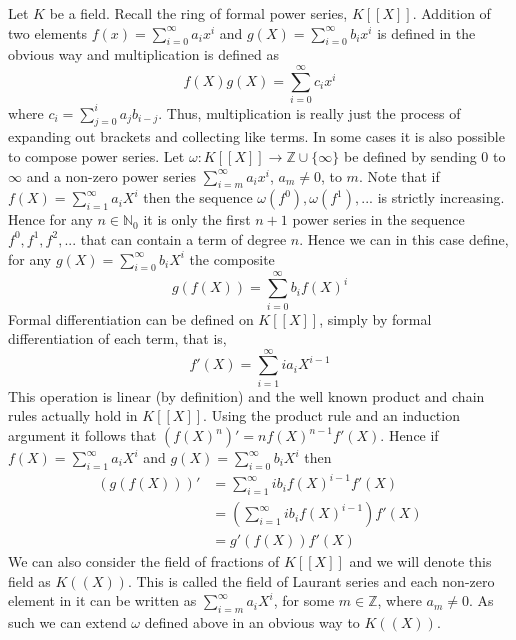 \documentclass{article}
\newcommand{\mbb}[1]{\mathbb{#1}}
\numberwithin{equation}{section}
\begin{document}
Let $K$ be a field. Recall the ring of formal power series, $K[[X]]$. Addition of two elements $f(x) = \sum_{i = 0}^\infty a_ix^i$ and $g(X) = \sum_{i = 0}^\infty b_ix^i$ is defined in the obvious way and multiplication is defined as
$$f(X)g(X) = \sum_{i = 0}^{\infty}c_i x^i$$
where $c_i = \sum_{j = 0}^i a_j b_{i-j}$. Thus, multiplication is really just the process of expanding out brackets and collecting like terms. In some cases it is also possible to compose power series. Let $\omega : K[[X]] \to \mbb Z \cup \{\infty \}$ be defined by sending $0$ to $\infty$ and a non-zero power series $\sum_{i = m}^\infty a_i x^i$, $a_m \neq 0$, to $m$. Note that if $f(X) = \sum_{i = 1}^\infty a_iX^i$ then the sequence $\omega(f^0), \omega(f^1), ...$ is strictly increasing. Hence for any $n \in \mbb N_0$ it is only the first $n+1$ power series in the sequence $f^0, f^1, f^2, ...$ that can contain a term of degree $n$.  
Hence we can in this case define, for any $g(X) = \sum_{i = 0}^\infty b_i X^i$ the composite
$$g(f(X)) = \sum_{i = 0}^\infty b_i f(X)^i$$
Formal differentiation can be defined on $K[[X]]$, simply by formal differentiation of each term, that is,
$$f'(X) = \sum_{i = 1}^\infty i a_{i} X^{i-1}$$
This operation is linear (by definition) and the well known product and chain rules actually hold in $K[[X]]$. Using the product rule and an induction argument it follows that $(f(X)^n)' = n f(X)^{n-1}f'(X)$. Hence if $f(X) = \sum_{i = 1}^\infty a_i X^i$ and $g(X) = \sum_{i = 0}^\infty b_i X^i$ then
\begin{align*}
	(g(f(X)))' &= \sum_{i = 1}^\infty ib_i f(X)^{i-1}f'(X)\\
	&= (\sum_{i = 1}^\infty i b_i f(X)^{i-1})f'(X) \\
	&= g'(f(X))f'(X)
\end{align*}
We can also consider the field of fractions of $K[[X]]$ and we will denote this field as $K((X))$. This is called the field of Laurant series and each non-zero element in it can be written as $\sum_{i = m}^\infty a_i X^i$, for some $m \in \mbb Z$, where $a_m \neq 0$. As such we can extend $\omega$ defined above in an obvious way to $K((X))$.
\end{document}
